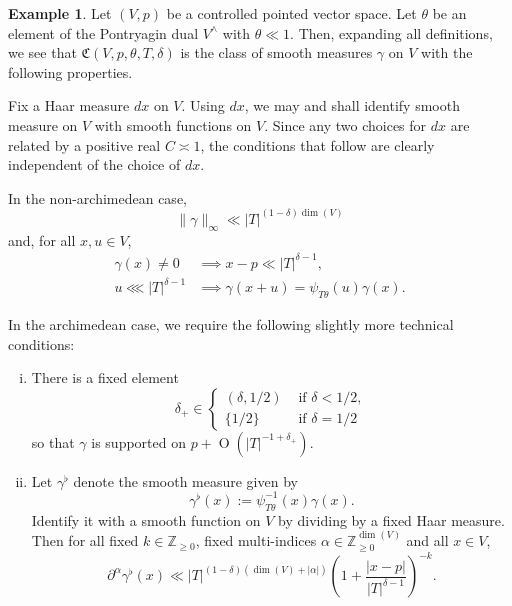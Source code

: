 \documentclass[reqno]{amsart}
\def\O{\operatorname{O}}
\theoremstyle{plain} \newtheorem{theorem} {Theorem}
\theoremstyle{definition} \newtheorem{definition} [theorem] {Definition}
\newtheorem{example} [theorem] {Example}
\theoremstyle{itplain} %
\numberwithin{equation}{section}
\numberwithin{theorem}{section}
\renewcommand{\geq}{\geqslant}
\begin{document}
\begin{example}\label{example:standard2:let-v-p}
  Let $(V,p)$ be a controlled pointed vector space.  Let $\theta$ be an element of the Pontryagin dual $V^\wedge$ with $\theta \ll 1$.  Then, expanding all definitions, we see that $\mathfrak{C}(V, p, \theta, T, \delta)$ is the class of smooth measures $\gamma$ on $V$ with the following properties.

  Fix a Haar measure $d x$ on $V$.  Using $d x$, we may and shall identify smooth measure on $V$ with smooth functions on $V$.  Since any two choices for $d x$ are related by a positive real $C \asymp 1$, the conditions that follow are clearly independent of the choice of $d x$.

  In the non-archimedean case,
  \begin{equation*}
    \|\gamma\|_{\infty} \ll |T|^{(1 - \delta) \dim(V)}
  \end{equation*}
  and, for all $x,u \in V$,
  \begin{align*}
    \gamma(x) \neq 0 &\implies x - p \ll  |T|^{\delta-1}, \\
    u \lll |T|^{\delta-1} &\implies \gamma(x+u) = \psi_{T \theta}(u) \gamma(x).
  \end{align*}

  In the archimedean case, we require the following slightly more technical conditions:
  \begin{enumerate}[(i)]
  \item \label{item:class-CGthetaTdelta:1} There is a fixed element
    \begin{equation*}
      \delta_+ \in \begin{cases}
        (\delta,1/2) & \text{ if } \delta < 1/2, \\
        \{1/2\} & \text{ if } \delta = 1/2
      \end{cases}
    \end{equation*}
    so that $\gamma$ is supported on $p + \O(|T|^{-1 + \delta_+})$.
  \item \label{item:class-CGthetaTdelta:2} Let $\gamma^{\flat}$ denote the smooth measure given by
    \begin{equation}\label{eq:gammaflatx-:=-psi_t}
      \gamma^{\flat}(x) := \psi_{T \theta}^{-1}(x) \gamma(x).
    \end{equation}
    Identify it with a smooth function on $V$ by dividing by a fixed Haar measure.  Then for all fixed $k \in \mathbb{Z}_{\geq 0}$, fixed multi-indices $\alpha \in \mathbb{Z}_{\geq 0}^{\dim(V)}$ and all $x \in V$,
    \begin{equation}\label{eq:y_1-dotsb-y_m-2}
      \partial^\alpha  \gamma^{\flat}(x)
      \ll |T|^{(1 - \delta) (\dim(V) + |\alpha|)} \left( 1 + \frac{|x-p|}{|T|^{\delta -1}} \right)^{-k}.
    \end{equation}
  \end{enumerate}
\end{example}
\end{document}
